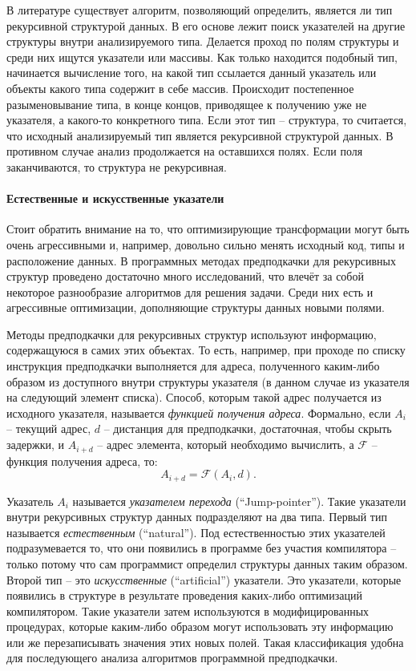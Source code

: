\documentclass[12pt,a4paper,oneside]{article}
\begin{document}
В литературе\cite{LukPhd} существует алгоритм, позволяющий определить, является ли тип рекурсивной структурой данных. В его основе лежит поиск указателей на другие структуры внутри анализируемого типа. Делается проход по полям структуры и среди них ищутся указатели или массивы. Как только находится подобный тип, начинается вычисление того, на какой тип ссылается данный указатель или объекты какого типа содержит в себе массив. Происходит постепенное разыменовывание типа, в конце концов, приводящее к получению уже не указателя, а какого-то конкретного типа. Если этот тип -- структура, то считается, что исходный анализируемый тип является рекурсивной структурой данных. В противном случае анализ продолжается на оставшихся полях. Если поля заканчиваются, то структура не рекурсивная.

\paragraph{Естественные и искусственные указатели}

Стоит обратить внимание на то, что оптимизирующие трансформации могут быть очень агрессивными и, например, довольно сильно менять исходный код, типы и расположение данных. В программных методах предподкачки для рекурсивных структур проведено достаточно много исследований, что влечёт за собой некоторое разнообразие алгоритмов для решения задачи. Среди них есть и агрессивные оптимизации, дополняющие структуры данных новыми полями.

Методы предподкачки для рекурсивных структур используют информацию, содержащуюся в самих этих объектах. То есть, например, при проходе по списку инструкция предподкачки выполняется для адреса, полученного каким-либо образом из доступного внутри структуры указателя (в данном случае из указателя на следующий элемент списка). Способ, которым такой адрес получается из исходного указателя, называется \emph{функцией получения адреса}\cite{LukPhd}\cite{LukRDS}. Формально, если $A_i$ -- текущий адрес, $d$ -- дистанция для предподкачки, достаточная, чтобы скрыть задержки, и $A_{i+d}$ -- адрес элемента, который необходимо вычислить, а $\mathcal{F}$ -- функция получения адреса, то:
\begin{displaymath}
  A_{i+d} = \mathcal{F}(A_i,d).
\end{displaymath}

Указатель $A_i$ называется \emph{указателем перехода} (``Jump-pointer''). Такие указатели внутри рекурсивных структур данных подразделяют на два типа. Первый тип называется \emph{естественным} (``natural''). Под естественностью этих указателей подразумевается то, что они появились в программе без участия компилятора -- только потому что сам программист определил структуры данных таким образом. Второй тип -- это \emph{искусственные} (``artificial'') указатели. Это указатели, которые появились в структуре в результате проведения каких-либо оптимизаций компилятором. Такие указатели затем используются в модифицированных процедурах, которые каким-либо образом могут использовать эту информацию или же перезаписывать значения этих новых полей. Такая классификация удобна для последующего анализа алгоритмов программной предподкачки.
\end{document}
